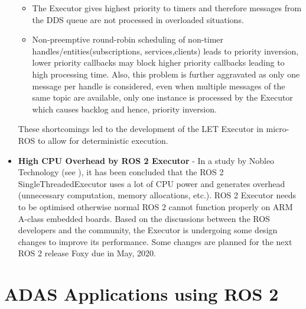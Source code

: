 \documentclass[%
xelatex,
	oneside,		%
	12pt,			%
	parskip=half,	%
	abstracton,
	chapterprefix=true%
    appendixprefix=true]
{scrbook}
\begin{document}
\begin{itemize}
\begin{itemize}
\item The Executor gives highest priority to timers and therefore messages from the DDS queue are not processed in overloaded situations.
\item Non-preemptive round-robin scheduling of non-timer handles/entities(subscriptions, services,clients) leads to priority inversion, lower priority callbacks may block higher priority callbacks leading to high processing time. Also, this problem is further aggravated as only one message per handle is considered, even when multiple messages of the same topic are available, only one instance is processed by the Executor which causes backlog and hence, priority inversion. 
\end{itemize} 
These shortcomings led to the development of the LET Executor in micro-ROS to allow for deterministic execution.
\item {\bfseries High CPU Overhead by ROS 2 Executor} - In a study by Nobleo Technology (see \cite{nobleo}), it has been concluded that the ROS 2 SingleThreadedExecutor uses a lot of CPU power and generates overhead (unnecessary computation, memory allocations, etc.). ROS 2 Executor needs to be optimised otherwise normal ROS 2 cannot function properly on ARM A-class embedded boards. Based on the discussions between the ROS developers and the community, the Executor is undergoing some design changes to improve its performance. Some changes are planned for the next ROS 2 release Foxy due in May, 2020.
\end{itemize}


	\chapter{ADAS Applications using ROS 2}
		
\end{document}
